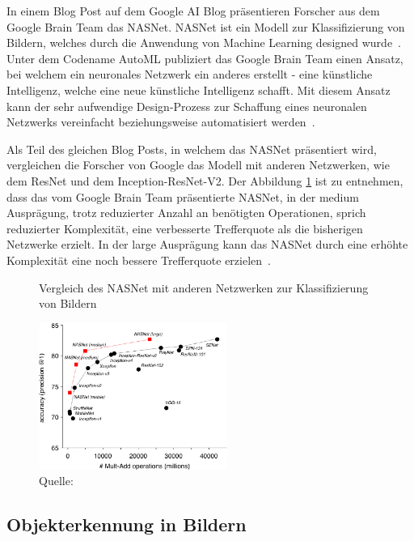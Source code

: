 In einem Blog Post auf dem Google AI Blog präsentieren Forscher aus dem Google Brain Team das NASNet. NASNet ist ein Modell zur Klassifizierung von Bildern, welches durch die Anwendung von Machine Learning designed wurde~\autocite{GoogleNasNet}. Unter dem Codename AutoML publiziert das Google Brain Team einen Ansatz, bei welchem ein neuronales Netzwerk ein anderes erstellt - eine künstliche Intelligenz, welche eine neue künstliche Intelligenz schafft. Mit diesem Ansatz kann der sehr aufwendige Design-Prozess zur Schaffung eines neuronalen Netzwerks vereinfacht beziehungsweise automatisiert werden~\autocite{GoogleAutoML}.

Als Teil des gleichen Blog Posts, in welchem das NASNet präsentiert wird, vergleichen die Forscher von Google das Modell mit anderen Netzwerken, wie dem ResNet und dem Inception-ResNet-V2. Der Abbildung \ref{nasnet-comparision} ist zu entnehmen, dass das vom Google Brain Team präsentierte NASNet, in der medium Ausprägung, trotz reduzierter Anzahl an benötigten Operationen, sprich reduzierter Komplexität, eine verbesserte Trefferquote als die bisherigen Netzwerke erzielt. In der large Ausprägung kann das NASNet durch eine erhöhte Komplexität eine noch bessere Trefferquote erzielen~\autocite{GoogleNasNet}.

\begin{figure}[h]
    \captionsetup{width=.9\linewidth}
    \caption{Vergleich des NASNet mit anderen Netzwerken zur Klassifizierung von Bildern}
    \label{nasnet-comparision}
    \centering
    \includegraphics[width=0.55\textwidth]{graphics/nasnet-comparision.jpg}
    \vspace*{0.2cm}
    \caption*{Quelle: \textcite{GoogleNasNet}}
\end{figure}

\subsection{Objekterkennung in Bildern}
\label{chap:object-detection}

